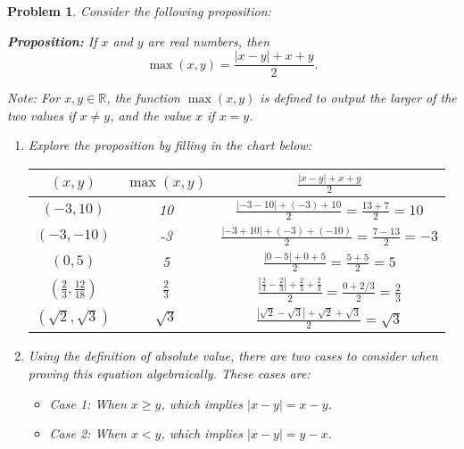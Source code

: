 \documentclass[12pt]{article}
\newtheorem{problem}{Problem}
\theoremstyle{definition}
\begin{document}
\bigskip

\begin{problem}
Consider the following proposition:

\textbf{Proposition:} If \( x \) and \( y \) are real numbers, then
\[
\max(x, y) = \frac{|x - y| + x + y}{2}.
\]

Note: For \( x, y \in \mathbb{R} \), the function \( \max(x, y) \) is defined to output the larger of the two values if \( x \neq y \), and the value \( x \) if \( x = y \).

\begin{enumerate}[label=(\alph*)]

\item Explore the proposition by filling in the chart below:

\begin{center}
    \begin{tabular}{|c|c|c|}
    \hline
    \( (x, y) \) & \( \max(x, y) \) & \( \frac{|x - y| + x + y}{2} \) \\
    \hline
    \( (-3, 10) \) & 10 & \( \frac{| -3 - 10 | + (-3) + 10}{2} = \frac{13 + 7}{2} = 10 \) \\
    \( (-3, -10) \) & -3 & \( \frac{| -3 + 10 | + (-3) + (-10)}{2} = \frac{7 - 13}{2} = -3 \) \\
    \( (0, 5) \) & 5 & \( \frac{| 0 - 5 | + 0 + 5}{2} = \frac{5 + 5}{2} = 5 \) \\
    \( \left(\frac{2}{3}, \frac{12}{18}\right) \) & \( \frac{2}{3} \) & \( \frac{\left| \frac{2}{3} - \frac{2}{3} \right| + \frac{2}{3} + \frac{2}{3}}{2} = \frac{0 + 2/3}{2} = \frac{2}{3} \) \\
    \( (\sqrt{2}, \sqrt{3}) \) & \( \sqrt{3} \) & \( \frac{| \sqrt{2} - \sqrt{3} | + \sqrt{2} + \sqrt{3}}{2} = \sqrt{3} \) \\
    \hline
    \end{tabular}
\end{center}

\item Using the definition of absolute value, there are two cases to consider when proving this equation algebraically. These cases are:

\begin{itemize}
    \item Case 1: When \( x \geq y \), which implies \( |x - y| = x - y \).
    \item Case 2: When \( x < y \), which implies \( |x - y| = y - x \).
\end{itemize}


\end{enumerate}
\end{problem}
\end{document}
